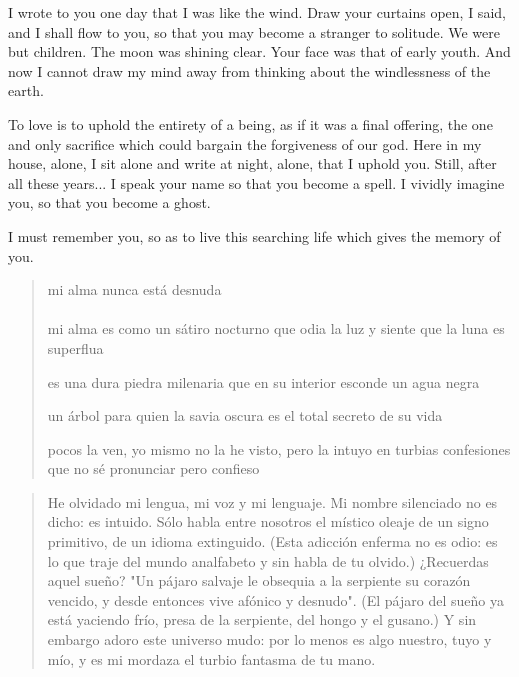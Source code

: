 \documentclass[a4paper, 12pt]{article}
\begin{document}
I wrote to you one day that I was like the wind. Draw your curtains open, I
said, and I shall flow to you, so that you may become a stranger to solitude. 
We were but children. The moon was shining clear. Your face was that of early
youth. And now I cannot draw my mind away from thinking about the windlessness of
the earth.

To love is to uphold the entirety of a being, as if it was a final offering, the
one and only sacrifice which could bargain the forgiveness of our god. Here in
my house, alone, I sit alone and write at night, alone, that I uphold you.
Still, after all these years... I speak your name so that you become a spell. I
vividly imagine you, so that you become a ghost. 

I must remember you, so as to live this searching life which gives the memory of
you.

\pagebreak 

\begin{verse}
    
mi alma nunca está desnuda\\

\\ 

mi alma es como un sátiro nocturno
que odia la luz y siente que la luna es superflua

es una dura piedra milenaria
que en su interior esconde un agua negra

un árbol para quien la savia oscura
es el total secreto de su vida

pocos la ven, yo mismo no la he visto,
pero la intuyo en turbias confesiones
que no sé pronunciar pero confieso




\end{verse}

\pagebreak

\begin{verse}
    He olvidado mi lengua, mi voz y mi lenguaje.
    Mi nombre silenciado no es dicho: es intuido.
    Sólo habla entre nosotros el místico oleaje 
    de un signo primitivo, de un idioma extinguido.
    (Esta adicción enferma no es odio: es lo que traje
    del mundo analfabeto y sin habla de tu olvido.)
    ¿Recuerdas aquel sueño? "Un pájaro salvaje 
    le obsequia a la serpiente su corazón vencido,
    y desde entonces vive afónico y desnudo".
    (El pájaro del sueño ya está yaciendo frío,
    presa de la serpiente, del hongo y el gusano.)
    Y sin embargo adoro este universo mudo:
    por lo menos es algo nuestro, tuyo y mío,
    y es mi mordaza el turbio fantasma de tu mano.
    \end{verse}
\end{document}
